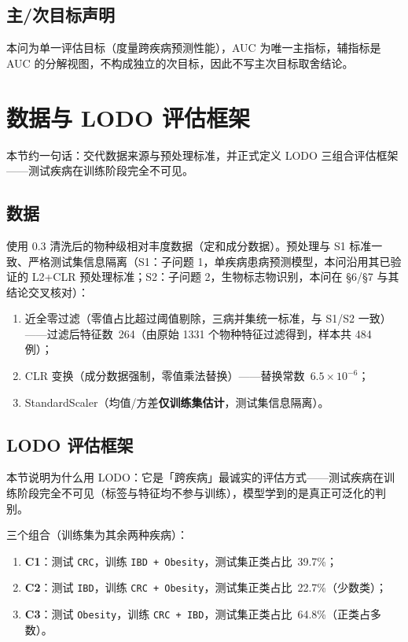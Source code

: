 \documentclass{internal-report}
\begin{document}
\subsection{主/次目标声明}
本问为单一评估目标（度量跨疾病预测性能），AUC 为唯一主指标，辅指标是 AUC 的分解视图，不构成独立的次目标，因此不写主次目标取舍结论。


\section{数据与 LODO 评估框架}

本节约一句话：交代数据来源与预处理标准，并正式定义 LODO 三组合评估框架——测试疾病在训练阶段完全不可见。

\subsection{数据}
使用 0.3 清洗后的物种级相对丰度数据（定和成分数据）。预处理与 S1 标准一致、严格测试集信息隔离（S1：子问题 1，单疾病患病预测模型，本问沿用其已验证的 L2+CLR 预处理标准；S2：子问题 2，生物标志物识别，本问在 §6/§7 与其结论交叉核对）：
\begin{enumerate}
  \item 近全零过滤（零值占比超过阈值剔除，三病并集统一标准，与 S1/S2 一致）——过滤后特征数\ 264（由原始 1331 个物种特征过滤得到，样本共 484 例）；
  \item CLR 变换（成分数据强制，零值乘法替换）——替换常数\ $6.5\times10^{-6}$；
  \item StandardScaler（均值/方差\textbf{仅训练集估计}，测试集信息隔离）。
\end{enumerate}

\subsection{LODO 评估框架}
本节说明为什么用 LODO：它是「跨疾病」最诚实的评估方式——测试疾病在训练阶段完全不可见（标签与特征均不参与训练），模型学到的是真正可泛化的判别。

三个组合（训练集为其余两种疾病）：
\begin{enumerate}
  \item \textbf{C1}：测试 \texttt{CRC}，训练 \texttt{IBD + Obesity}，测试集正类占比\ 39.7\%；
  \item \textbf{C2}：测试 \texttt{IBD}，训练 \texttt{CRC + Obesity}，测试集正类占比\ 22.7\%（少数类）；
  \item \textbf{C3}：测试 \texttt{Obesity}，训练 \texttt{CRC + IBD}，测试集正类占比\ 64.8\%（正类占多数）。
\end{enumerate}
\end{document}

